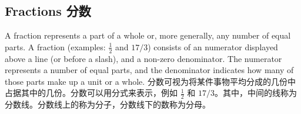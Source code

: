 \subsection{Fractions 分数}

\begin{paracol}{2}
A fraction represents a part of a whole or, more generally, any number of equal parts. A fraction (examples:  $\frac{1}{2}$ and $17/3$) consists of an numerator displayed above a line (or before a slash), and a non-zero denominator. The numerator represents a number of equal parts, and the denominator indicates how many of those parts make up a unit or a whole. 
\switchcolumn
分数可视为将某件事物平均分成的几份中占据其中的几份。分数可以用分式来表示，例如 $\frac{1}{2}$ 和 $17/3$。其中，中间的线称为分数线。分数线上的称为分子，分数线下的数称为分母。
\end{paracol}

